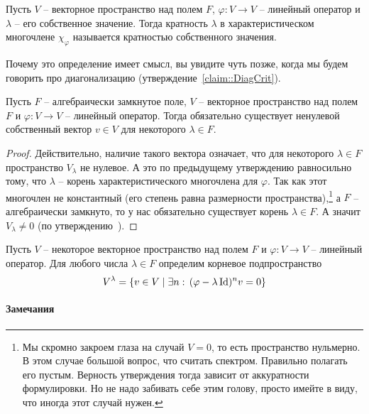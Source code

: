 \begin{definition}
Пусть $V$ -- векторное пространство над полем $F$, $\varphi\colon V\to V$ -- линейный оператор и $\lambda$ -- его собственное значение. Тогда кратность $\lambda$ в характеристическом многочлене $\chi_\varphi$ называется кратностью собственного значения.
\end{definition}

Почему это определение имеет смысл, вы увидите чуть позже, когда мы будем говорить про диагонализацию (утверждение~\ref{claim::DiagCrit}).


\begin{claim}
Пусть $F$ -- алгебраически замкнутое поле, $V$ -- векторное пространство над полем $F$ и $\varphi\colon V\to V$ -- линейный оператор. Тогда обязательно существует ненулевой собственный вектор $v\in V$ для некоторого $\lambda\in F$.
\end{claim}
\begin{proof}
Действительно, наличие такого вектора означает, что для некоторого $\lambda\in F$ пространство $V_\lambda$ не нулевое. А это по предыдущему утверждению равносильно тому, что $\lambda$ -- корень характеристического многочлена для $\varphi$. Так как этот многочлен не константный (его степень равна размерности пространства),\footnote{Мы скромно закроем глаза на случай $V = 0$, то есть пространство нульмерно. В этом случае большой вопрос, что считать спектром. Правильно полагать его пустым. Верность утверждения тогда зависит от аккуратности формулировки. Но не надо забивать себе этим голову, просто имейте в виду, что иногда этот случай нужен.} а $F$ -- алгебраически замкнуто, то у нас обязательно существует корень $\lambda\in F$. А значит $V_\lambda \neq 0$ (по утверждению~\label{claim::EigenSpec}).
\end{proof}

\begin{definition}
Пусть $V$ -- некоторое векторное пространство над полем $F$ и $\varphi \colon V\to V$ -- линейный оператор. Для любого числа $\lambda \in F$ определим корневое подпространство
\[
V^\lambda = \{v\in V\mid \exists n:\,(\varphi - \lambda\operatorname{Id})^n v = 0\}
\]
\end{definition}

\paragraph{Замечания}

